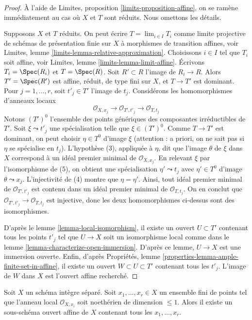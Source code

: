 \begin{proof}
À l'aide de Limites, proposition \ref{limits-proposition-affine},
on se ramène immédiatement au cas où $X$ et $T$ sont réduits.
Nous omettons les détails.

\medskip\noindent
Supposons $X$ et $T$ réduits. On peut écrire $T = \lim_{i \in I} T_i$
comme limite projective de schémas de présentation finie sur $X$
à morphismes de transition affines, voir
Limites, lemme \ref{limits-lemma-relative-approximation}.
Choisissons $i \in I$ tel que $T_i$ soit affine, voir
Limites, lemme \ref{limits-lemma-limit-affine}.
Écrivons $T_i = \Spec(R_i)$ et $T = \Spec(R)$.
Soit $R' \subset R$ l'image de $R_i \to R$.
Alors $T' = \Spec(R')$ est affine, réduit, de type fini sur $X$,
et $T \to T'$ est dominant. Pour $j = 1, \ldots, r$, soit $t'_j \in T'$
l'image de $t_j$. Considérons les homomorphismes d'anneaux locaux
$$
\mathcal{O}_{X, x_j} \to
\mathcal{O}_{T', t'_j} \to
\mathcal{O}_{T, t_j}
$$
Notons $(T')^0$ l'ensemble des points génériques des composantes irréductibles
de $T'$. Soit $\xi \leadsto t'_j$ une spécialisation telle que
$\xi \in (T')^0$. Comme $T \to T'$ est dominant, on peut choisir $\eta \in T^0$ 
d'image $\xi$ (attention : a priori, on ne sait pas si $\eta$ se spécialise
en $t_j$). L'hypothèse (3), appliquée à $\eta$, dit que l'image $\theta$
de $\xi$ dans $X$ correspond à un idéal premier minimal de $\mathcal{O}_{X, x_j}$.
En relevant $\xi$ par l'isomorphisme de (5), on obtient une spécialisation
$\eta' \leadsto t_j$ avec $\eta' \in T^0$ d'image $\theta \leadsto x_j$.
L'injectivité de (4) montre que $\eta = \eta'$. Ainsi,
tout idéal premier minimal de $\mathcal{O}_{T', t'_j}$ est contenu dans
un idéal premier minimal de $\mathcal{O}_{T, t_j}$. On en conclut que
$\mathcal{O}_{T', t'_j} \to \mathcal{O}_{T, t_j}$ est injective,
donc les deux homomorphismes ci-dessus sont des isomorphismes.

\medskip\noindent
D'après le lemme \ref{lemma-local-isomorphism}, il existe un ouvert
$U \subset T'$ contenant tous les points $t'_j$ tel que
$U \to X$ soit un isomorphisme local comme dans le
lemme \ref{lemma-characterize-open-immersion}.
D'après ce lemme, $U \to X$ est une immersion ouverte.
Enfin, d'après
Propriétés, lemme \ref{properties-lemma-ample-finite-set-in-affine},
il existe un ouvert $W \subset U \subset T'$
contenant tous les $t'_j$. L'image de $W$ dans $X$ est
l'ouvert affine recherché.
\end{proof}

\begin{lemma}
\label{lemma-finite-set-codim-1-points-in-affine}
Soit $X$ un schéma intègre séparé. Soit $x_1, \ldots, x_r \in X$
un ensemble fini de points tel que l'anneau local $\mathcal{O}_{X, x_i}$
soit noethérien de dimension $\leq 1$. Alors il existe un sous-schéma
ouvert affine de $X$ contenant tous les $x_1, \ldots, x_r$.
\end{lemma}

